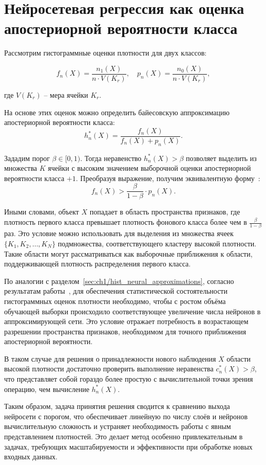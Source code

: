 \section{Нейросетевая регрессия как оценка апостериорной вероятности класса}

Рассмотрим гистограммные оценки плотности для двух классов:

\[
f_n(X) = \frac{n_1(X)}{n \cdot V(K_r)}, \quad p_n(X) = \frac{n_0(X)}{n \cdot V(K_r)},
\]

\noindent где \(V(K_r)\) -- мера ячейки \(K_r\).

На основе этих оценок можно определить байесовскую аппроксимацию апостериорной вероятности класса:
\[
h_n^*(X) = \frac{f_n(X)}{f_n(X) + p_n(X)}.
\]

Зададим порог \(\beta \in [0, 1)\). Тогда неравенство \(h_n^*(X) > \beta\) позволяет выделить из множества \(K\) ячейки с высоким значением выборочной оценки апостериорной вероятности класса \(+1\). Преобразуя выражение, получим эквивалентную форму~\cite{mitsobi2025}:
\[
f_n(X) > \frac{\beta}{1 - \beta} \cdot p_n(X).
\]

Иными словами, объект \(X\) попадает в область пространства признаков, где плотность первого класса превышает плотность фонового класса более чем в \(\frac{\beta}{1 - \beta}\) раз. Это условие можно использовать для выделения из множества ячеек \(\{K_1, K_2, \ldots, K_N\}\) подмножества, соответствующего кластеру высокой плотности. Такие области могут рассматриваться как выборочные приближения к области, поддерживающей плотность распределения первого класса.

По аналогии с разделом~\cref{sec:ch1/hist_neural_approximations}, согласно результатам работы~\cite{devroye2013probabilistic}, для обеспечения статистической состоятельности гистограммных оценок плотности необходимо, чтобы с ростом объёма обучающей выборки происходило соответствующее увеличение числа нейронов в аппроксимирующей сети. Это условие отражает потребность в возрастающем разрешении пространства признаков, необходимом для точного приближения апостериорной вероятности.

В таком случае для решения о принадлежности нового наблюдения \(X\) области высокой плотности достаточно проверить выполнение неравенства \(c_n^*(X) > \beta\), что представляет собой гораздо более простую с вычислительной точки зрения операцию, чем вычисление \(h_n^*(X)\).

Таким образом, задача принятия решения сводится к сравнению выхода нейросети с порогом, что обеспечивает линейную по числу слоёв и нейронов вычислительную сложность и устраняет необходимость работы с явным представлением плотностей. Это делает метод особенно привлекательным в задачах, требующих масштабируемости и эффективности при обработке новых входных данных.
